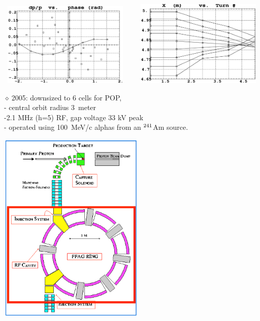 \documentclass[12pt]{article}
\newcommand{\nid}{\noindent \ensuremath{\diamond~}}
\begin{document}
\begin{minipage}{1.\linewidth}
\begin{minipage}{.63\linewidth}
\begin{center}
\mbox{
\includegraphics*[bbllx=20,bblly=100,bburx=567,bbury=480,width=6.00cm]{./figs_FFAG_introSlides/prism_phase-dp.eps} ~ ~ 
\includegraphics*[bbllx=20,bblly=100,bburx=567,bbury=480,width=6.00cm]{./figs_FFAG_introSlides/prism_x-pass.eps}
}
\end{center}


{\color{blue}
\nid 2005: downsized to 6 cells for POP, \\
- central orbit radius 3~meter \\
-2.1 MHz (h=5) RF, gap voltage 33 kV peak \\
- operated using 100~MeV/c alphas from an $\rm ^{241}$Am source.

}


\end{minipage}\hspace{10mm}
\begin{minipage}{.36\linewidth}


\begin{center}

\includegraphics[width=7.00cm]{./figs_FFAG_introSlides/prism_ring.eps}


\end{center}
\end{minipage}
\end{minipage}
\end{document}
